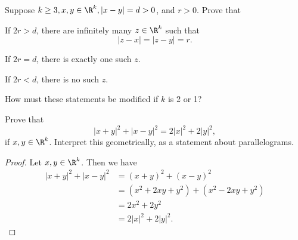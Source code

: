 \documentclass{assignment}
\begin{document}
\begin{question}[16]
  Suppose $k\geq 3, x,y\in\R^k, |x - y| = d > 0$, and $r > 0$. Prove that 
  \begin{qparts}
    \item If $2r > d$, there are infinitely many $z\in\R^k$ such that $$|z-x| = |z - y| = r.$$
    \item If $2r = d$, there is exactly one such $z$.
    \item If $2r < d$, there is no such $z$.
  \end{qparts}
  How must these statements be modified if $k$ is 2 or 1?
\end{question}

\begin{question}[17]
  Prove that $$|x + y|^2 + |x - y|^2 = 2|x|^2 + 2|y|^2,$$ if $x,y\in\R^k$. Interpret this geometrically,
  as a statement about parallelograms.
\end{question}
\begin{proof}
  Let $x,y\in\R^k$. Then we have
  \begin{align*}
    |x+y|^2 + |x-y|^2 &= (x+y)^2 + (x-y)^2 \\
                      &= (x^2 + 2xy + y^2) + (x^2 - 2xy + y^2) \\
                      &= 2x^2 + 2y^2 \\
                      &= 2|x|^2 + 2|y|^2.
  \end{align*}
\end{proof}
\end{document}
